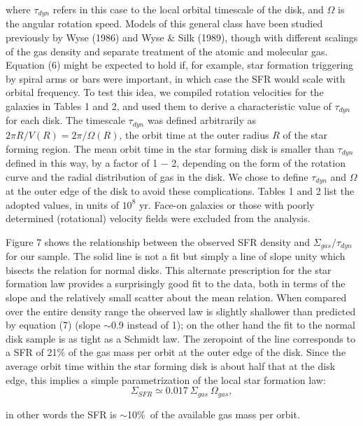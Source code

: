 \noindent
where $\tau_{dyn}$ refers in this case to the local orbital timescale
of the disk, and $\Omega$ is the angular rotation speed.  Models of this
general class have been studied previously by Wyse (1986) and Wyse \&
Silk (1989), though with different scalings of the gas density and 
separate treatment of the atomic and molecular gas.   Equation (6)
might be expected to hold if, for example, star formation triggering
by spiral arms or bars were important, in which case the SFR would scale 
with orbital frequency.  To test this idea,   
we compiled rotation velocities for the galaxies in Tables 1 and 2, and
used them to derive a characteristic value of $\tau_{dyn}$ for each disk.
The timescale $\tau_{dyn}$ was defined arbitrarily as 
$ {2 \pi R / V(R)} = 2 \pi / \Omega(R)$, the orbit time at the outer radius 
$R$ of the star forming region.  The mean orbit time in the star forming 
disk is smaller than $\tau_{dyn}$ defined in this way, 
by a factor of 1 $-$ 2, depending on the form of the 
rotation curve and the radial distribution of gas in the disk.  We chose to
define $\tau_{dyn}$ and $\Omega$ at the outer edge of the disk to avoid these 
complications.  Tables 1 and 2 list the adopted values, in units of $10^8$ yr.
Face-on galaxies or those with poorly determined (rotational) velocity
fields were excluded from the analysis.

Figure 7 shows the relationship between the observed SFR density
and $\Sigma_{gas} / \tau_{dyn}$ for our sample.  The solid line
is not a fit but simply a line of slope unity which bisects
the relation for normal disks.  This alternate prescription
for the star formation law provides a surprisingly good fit to
the data, both in terms of the slope and the relatively small scatter
about the mean relation.  When compared over the entire density range
the observed law is slightly shallower than predicted by equation (7)
(slope $\sim$0.9 instead of 1); on the other hand the fit to the normal
disk sample is as tight as a Schmidt law.  The zeropoint of 
the line corresponds to a SFR of 21\% of the gas mass per
orbit at the outer edge of the disk.  Since the average orbit
time within the star forming disk is about half that at the disk
edge, this implies a simple parametrization of the local star 
formation law:
\begin{equation}
\Sigma_{SFR} \simeq 0.017~\Sigma_{gas}~\Omega_{gas}   ,
\end{equation}

\noindent
in other words the SFR is $\sim$10\%\ of the available gas mass 
per orbit.  

